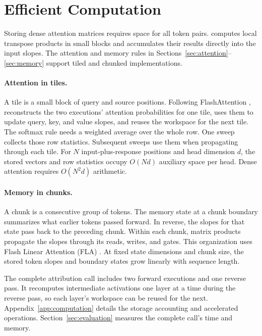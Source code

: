 \section{Efficient Computation}
\label{sec:computation}
Storing dense attention matrices requires space for all token pairs. \dt{} computes local transpose products in small blocks and accumulates their results directly into the input slopes. The attention and memory rules in Sections~\ref{sec:attention}--\ref{sec:memory} support tiled and chunked implementations.

\paragraph{Attention in tiles.}
A tile is a small block of query and source positions. Following FlashAttention \citep{dao2022flashattention}, \dt{} reconstructs the two executions' attention probabilities for one tile, uses them to update query, key, and value slopes, and reuses the workspace for the next tile. The softmax rule needs a weighted average over the whole row. One sweep collects those row statistics. Subsequent sweeps use them when propagating through each tile. For $N$ input-plus-response positions and head dimension $d$, the stored vectors and row statistics occupy $O(Nd)$ auxiliary space per head. Dense attention requires $O(N^2d)$ arithmetic.

\paragraph{Memory in chunks.}
A chunk is a consecutive group of tokens. The memory state at a chunk boundary summarizes what earlier tokens passed forward. In reverse, the slopes for that state pass back to the preceding chunk. Within each chunk, matrix products propagate the slopes through its reads, writes, and gates. This organization uses Flash Linear Attention (FLA) \citep{yang2024fla}. At fixed state dimensions and chunk size, the stored token slopes and boundary states grow linearly with sequence length.

The complete attribution call includes two forward executions and one reverse pass. It recomputes intermediate activations one layer at a time during the reverse pass, so each layer's workspace can be reused for the next. Appendix~\ref{app:computation} details the storage accounting and accelerated operations. Section~\ref{sec:evaluation} measures the complete call's time and memory.
